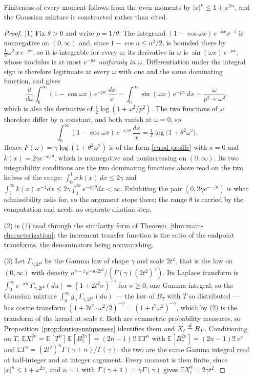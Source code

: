 Finiteness of every moment follows from the even moments by $|x|^n \le 1 + x^{2n}$, and the
Gaussian mixture is constructed rather than cited.

\begin{proof}
(1) Fix $\theta > 0$ and write $p = 1/\theta$. The integrand
$(1 - \cos\omega x)\,e^{-px}x^{-1}$ is nonnegative on $(0,\infty)$ and, since
$1 - \cos u \le u^2/2$, is bounded there by $\tfrac12\omega^2\,x\,e^{-px}$, so it is integrable
for every $\omega$; its derivative in $\omega$ is $\sin(\omega x)\,e^{-px}$, whose modulus is at
most $e^{-px}$ \emph{uniformly in} $\omega$. Differentiation under the integral sign is
therefore legitimate at every $\omega$ with one and the same dominating function, and gives
\[
  \frac{d}{d\omega}\int_0^\infty (1 - \cos\omega x)\,e^{-px}\,\frac{dx}{x}
   = \int_0^\infty \sin(\omega x)\,e^{-px}\,dx = \frac{\omega}{p^2+\omega^2},
\]
which is also the derivative of $\tfrac12\log(1 + \omega^2/p^2)$. The two functions of $\omega$
therefore differ by a constant, and both vanish at $\omega = 0$, so
\[
  \int_0^\infty (1 - \cos\omega x)\,e^{-x/\theta}\,\frac{dx}{x}
   = \tfrac12\log\bigl(1 + \theta^2\omega^2\bigr).
\]
Hence $F(\omega) = \gamma\log(1+\theta^2\omega^2)$ is of the form \ref{eq:sd-profile} with
$a = 0$ and $k(x) = 2\gamma e^{-x/\theta}$, which is nonnegative and nonincreasing on
$(0,\infty)$. Its two integrability conditions are the two dominating functions above read on
the two halves of the range: $\int_0^1 x\,k(x)\,dx \le 2\gamma$ and
$\int_1^\infty k(x)\,x^{-1}dx \le 2\gamma\int_1^\infty e^{-x/\theta}dx < \infty$. Exhibiting the
pair $(0, 2\gamma e^{-\cdot/\theta})$ is what admissibility asks for, so the argument stops
there; the range $\theta$ is carried by the computation and needs no separate dilation step.

(2) is (1) read through the similarity form of Theorem~\ref{thm:main-characterization}: the
increment transfer function is the ratio of the endpoint transforms, the denominators being
nonvanishing.

(3) Let $\Gamma_{\gamma,2t^2}$ be the Gamma law of shape $\gamma$ and scale $2t^2$, that is the
law on $(0,\infty)$ with density $u^{\gamma-1}e^{-u/2t^2}/(\Gamma(\gamma)(2t^2)^{\gamma})$. Its
Laplace transform is $\int_0^\infty e^{-\sigma u}\,\Gamma_{\gamma,2t^2}(du) =
(1 + 2t^2\sigma)^{-\gamma}$ for $\sigma \ge 0$, one Gamma integral; so the Gaussian mixture
$\int_0^\infty g_u\,\Gamma_{\gamma,2t^2}(du)$ --- the law of $B_T$ with $T$ so distributed ---
has cosine transform $(1 + 2t^2\cdot\omega^2/2)^{-\gamma} = (1 + t^2\omega^2)^{-\gamma}$, which
by (2) is the transform of the kernel at scale $t$. Both are symmetric probability measures, so
Proposition~\ref{prop:fourier-uniqueness} identifies them and $X_t \stackrel{d}{=} B_T$. Conditioning on
$T$, $\mathbb{E}X_t^{2n} = \mathbb{E}[T^n]\,\mathbb{E}[B_1^{2n}] = (2n-1)!!\;\mathbb{E}T^n$
with $\mathbb{E}[B_v^{2n}] = (2n-1)!!\,v^n$ and
$\mathbb{E}T^n = (2t^2)^n\Gamma(\gamma+n)/\Gamma(\gamma)$; the two are the same Gamma integral
read at half-integer and at integer argument. Every moment is then finite, since
$|x|^n \le 1 + x^{2n}$, and $n = 1$ with $\Gamma(\gamma+1) = \gamma\Gamma(\gamma)$ gives
$\mathbb{E}X_t^2 = 2\gamma t^2$.


\end{proof}
